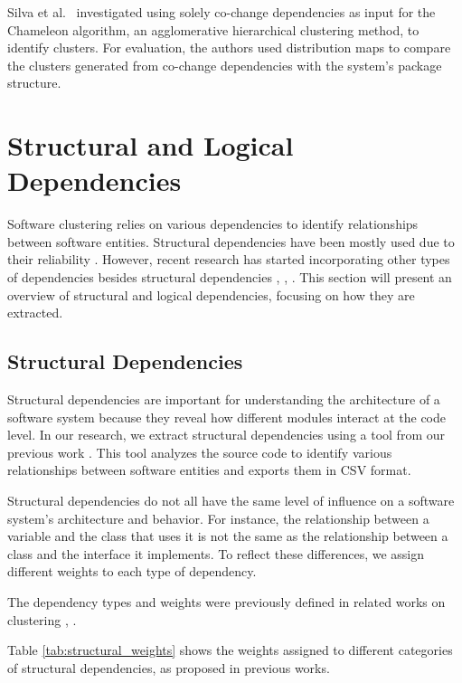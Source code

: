 \documentclass{ieeeaccess}
\begin{document}
Silva et al.~\cite{b16} investigated using solely co-change dependencies as input for the Chameleon algorithm, an agglomerative hierarchical clustering method, to identify clusters. For evaluation, the authors used distribution maps to compare the clusters generated from co-change dependencies with the system's package structure.



\section{Structural and Logical Dependencies}
\label{sec:dependencies}

Software clustering relies on various dependencies to identify relationships between software entities. Structural dependencies have been mostly used due to their reliability \cite{b12}. However, recent research has started incorporating other types of dependencies besides structural dependencies \cite{b13}, \cite{b14}, \cite{b18}. This section will present an overview of structural and logical dependencies, focusing on how they are extracted.

\subsection{Structural Dependencies}

Structural dependencies are important for understanding the architecture of a software system because they reveal how different modules interact at the code level. In our research, we extract structural dependencies using a tool from our previous work \cite{b4}. This tool analyzes the source code to identify various relationships between software entities and exports them in CSV format.

Structural dependencies do not all have the same level of influence on a software system’s architecture and behavior. For instance, the relationship between a variable and the class that uses it is not the same as the relationship between a class and the interface it implements. To reflect these differences, we assign different weights to each type of dependency.

The dependency types and weights were previously defined in related works on clustering \cite{b19}, \cite{b20}.

Table \ref{tab:structural_weights} shows the weights assigned to different categories of structural dependencies, as proposed in previous works.
\end{document}
